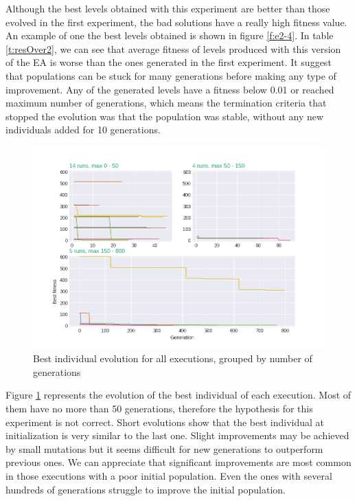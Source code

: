 \documentclass[a4paper,twoside]{article}
\begin{document}
Although the best levels obtained with this experiment are better than those 
evolved in the first experiment, the bad solutions have a really high fitness 
value. An example of one the best levels obtained is shown in figure \ref{f:e2-4}.
In table \ref{t:resOver2}, we can see that average fitness of levels 
produced with this version of the EA is worse than the ones generated in the 
first experiment. It suggest that populations can be stuck for many generations 
before making any type of improvement. Any of the generated levels have a 
fitness below 0.01 or reached maximum number of generations, which means the 
termination criteria that stopped the evolution was that the population was 
stable, without any new individuals added for 10 generations.
\begin{figure}[H]
	\centering
	\includegraphics[scale=0.4]{exp2_explication.png}
	\caption{Best individual evolution for all executions, grouped by number of 
	generations}\label{f:grahp2}
\end{figure}
Figure \ref{f:grahp2} represents the evolution of the best individual of each 
execution. Most of them have no more than 50 generations, therefore the 
hypothesis for this experiment is not correct. Short evolutions show that the 
best individual at initialization is very similar to the last one. Slight 
improvements may be achieved by small mutations but it seems difficult for new 
generations to outperform previous ones. We can appreciate that significant 
improvements are most common in those executions with a poor initial 
population. Even the ones with several hundreds of generations struggle to 
improve the initial population.
\end{document}
